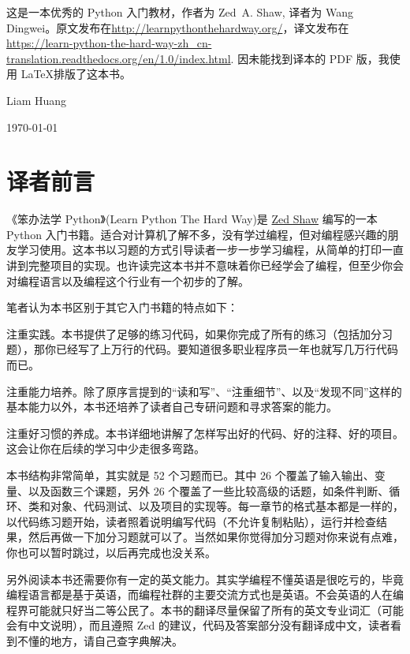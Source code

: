 \begin{titlepage}
	这是一本优秀的 Python 入门教材，作者为 Zed~A. Shaw, 译者为 Wang Dingwei。原文发布在\url{http://learnpythonthehardway.org/}，译文发布在\url{https://learn-python-the-hard-way-zh_cn-translation.readthedocs.org/en/1.0/index.html}. 因未能找到译本的 PDF 版，我使用 \LaTeX 排版了这本书。

    \bigskip

    \hfill Liam Huang

    \hfill \today
\end{titlepage}
\section*{译者前言} %
\label{sec:译者前言}
《笨办法学 Python》(Learn Python The Hard Way)是 \href{http://zedshaw.com/}{Zed Shaw} 编写的一本 Python 入门书籍。适合对计算机了解不多，没有学过编程，但对编程感兴趣的朋友学习使用。这本书以习题的方式引导读者一步一步学习编程，从简单的打印一直讲到完整项目的实现。也许读完这本书并不意味着你已经学会了编程，但至少你会对编程语言以及编程这个行业有一个初步的了解。

笔者认为本书区别于其它入门书籍的特点如下：

\begin{compactitem}
	\item 注重实践。本书提供了足够的练习代码，如果你完成了所有的练习（包括加分习题），那你已经写了上万行的代码。要知道很多职业程序员一年也就写几万行代码而已。
	\item 注重能力培养。除了原序言提到的“读和写”、“注重细节”、以及“发现不同”这样的基本能力以外，本书还培养了读者自己专研问题和寻求答案的能力。
	\item 注重好习惯的养成。本书详细地讲解了怎样写出好的代码、好的注释、好的项目。这会让你在后续的学习中少走很多弯路。
\end{compactitem}

本书结构非常简单，其实就是 52 个习题而已。其中 26 个覆盖了输入输出、变量、以及函数三个课题，另外 26 个覆盖了一些比较高级的话题，如条件判断、循环、类和对象、代码测试、以及项目的实现等。每一章节的格式基本都是一样的，以代码练习题开始，读者照着说明编写代码（不允许复制粘贴），运行并检查结果，然后再做一下加分习题就可以了。当然如果你觉得加分习题对你来说有点难，你也可以暂时跳过，以后再完成也没关系。

另外阅读本书还需要你有一定的英文能力。其实学编程不懂英语是很吃亏的，毕竟编程语言都是基于英语，而编程社群的主要交流方式也是英语。不会英语的人在编程界可能就只好当二等公民了。本书的翻译尽量保留了所有的英文专业词汇（可能会有中文说明），而且遵照 Zed 的建议，代码及答案部分没有翻译成中文，读者看到不懂的地方，请自己查字典解决。

